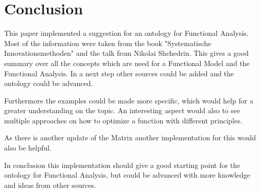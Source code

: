 \section{Conclusion}
\label{sec:conclusion}

This paper implemented a suggestion for an ontology for Functional Analysis.
Most of the information were taken from the book "Systematische  Innovationsmethoden" and the talk from Nikolai Shchedrin. 
This gives a good summary over all the concepts which are need for a Functional Model and the Functional Analysis. 
In a next step other sources could be added and the ontology could be advanced.

Furthermore the examples could be made more specific, which would help for a greater understanding on the topic. 
An interesting aspect would also to see multiple approaches on how to optimize a function with different principles.

As there is another update of the Matrix another implementation for this would also be helpful.

In conclusion this implementation should give a good starting point for the ontology for Functional Analysis, but could be advanced with more knowledge and ideas from other sources. 